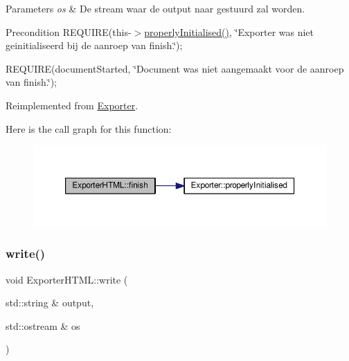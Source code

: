 \begin{DoxyParams}{Parameters}
{\em os} & De stream waar de output naar gestuurd zal worden. \\
\hline
\end{DoxyParams}
\begin{DoxyPrecond}{Precondition}
R\+E\+Q\+U\+I\+RE(this-\/$>$\hyperlink{class_exporter_aafd9df9210aeefd7bb7fd434fc317cf0}{properly\+Initialised()}, \char`\"{}\+Exporter was niet geinitialiseerd bij de aanroep van finish.\char`\"{}); 

R\+E\+Q\+U\+I\+RE(document\+Started, \char`\"{}\+Document was niet aangemaakt voor de aanroep van finish.\char`\"{}); 
\end{DoxyPrecond}


Reimplemented from \hyperlink{class_exporter_ae477714f462d70cfc5b3970f91fcc4ed}{Exporter}.

Here is the call graph for this function\+:\nopagebreak
\begin{figure}[H]
\begin{center}
\leavevmode
\includegraphics[width=350pt]{class_exporter_h_t_m_l_aefa1c658f3c3c55bd7725bdad09629b3_cgraph}
\end{center}
\end{figure}
\mbox{\label{class_exporter_h_t_m_l_ace2649c240282289d4cb3bfbd19e427c}} 
\subsubsection{\texorpdfstring{write()}{write()}}
{\footnotesize\ttfamily void Exporter\+H\+T\+M\+L\+::write (\begin{DoxyParamCaption}\item[{std\+::string \&}]{output,  }\item[{std\+::ostream \&}]{os }\end{DoxyParamCaption})\hspace{0.3cm}{\ttfamily [virtual]}}



